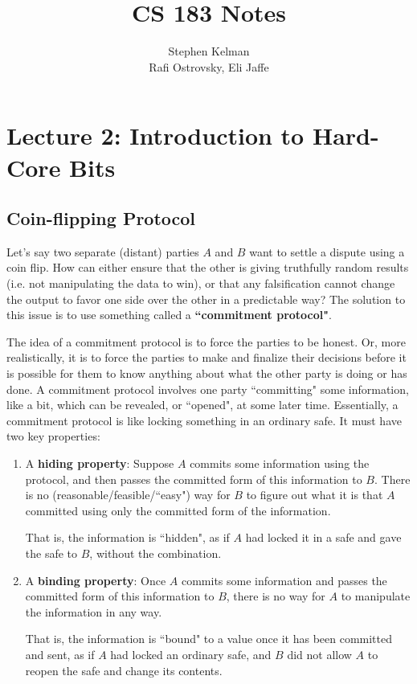\documentclass[11pt]{article}
\title{CS 183 Notes}
\author{Stephen Kelman\\ Rafi Ostrovsky, Eli Jaffe}
\begin{document}
\section{Lecture 2: Introduction to Hard-Core Bits}

\subsection{Coin-flipping Protocol}

Let's say two separate (distant) parties \(A\) and \(B\) want to settle a dispute using a coin flip. How can either ensure that the other is giving truthfully random results (i.e. not manipulating the data to win), or that any falsification cannot change the output to favor one side over the other in a predictable way? The solution to this issue is to use something called a \textbf{``commitment protocol"}.\medskip

The idea of a commitment protocol is to force the parties to be honest. Or, more realistically, it is to force the parties to make and finalize their decisions before it is possible for them to know anything about what the other party is doing or has done. A commitment protocol involves one party ``committing" some information, like a bit, which can be revealed, or ``opened", at some later time. Essentially, a commitment protocol is like locking something in an ordinary safe. It must have two key properties:

\begin{enumerate}
\item A \textbf{hiding property}: Suppose \(A\) commits some information using the protocol, and then passes the committed form of this information to \(B\). There is no (reasonable/feasible/``easy") way for \(B\) to figure out what it is that \(A\) committed using only the committed form of the information. 

That is, the information is ``hidden", as if \(A\) had locked it in a safe and gave the safe to \(B\), without the combination.
\item A \textbf{binding property}: Once \(A\) commits some information and passes the committed form of this information to \(B\), there is no way for \(A\) to manipulate the information in any way. 

That is, the information is ``bound" to a value once it has been committed and sent, as if \(A\) had locked an ordinary safe, and \(B\) did not allow \(A\) to reopen the safe and change its contents.
\end{enumerate}
\end{document}
